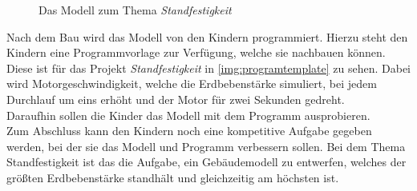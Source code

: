 \begin{figure}[htbp!]
	\centering
	\caption[Das Modell zum Thema Standfestigkeit]{Das Modell zum Thema \textit{Standfestigkeit}}
	\label{img:subject}
\end{figure} 

Nach dem Bau wird das Modell von den Kindern programmiert. Hierzu steht den Kindern eine Programmvorlage zur Verfügung, welche sie nachbauen können. Diese ist für das Projekt \textit{Standfestigkeit} in \ref{img:programtemplate} zu sehen. Dabei wird Motorgeschwindigkeit, welche die Erdbebenstärke simuliert, bei jedem Durchlauf um eins erhöht und der Motor für zwei Sekunden gedreht.\\
Daraufhin sollen die Kinder das Modell mit dem Programm ausprobieren.\\
Zum Abschluss kann den Kindern noch eine kompetitive Aufgabe gegeben werden, bei der sie das Modell und Programm verbessern sollen. Bei dem Thema Standfestigkeit ist das die Aufgabe, ein Gebäudemodell zu entwerfen, welches der größten Erdbebenstärke standhält und gleichzeitig am höchsten ist.

